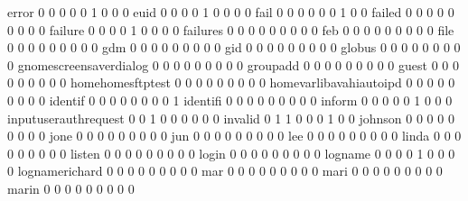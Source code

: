 \documentclass[compress,8pt]{beamer}
\begin{document}
\begin{frame}
\begin{Schunk}
  error                                      0   0   0   0   0   1   0   0   0
  euid                                       0   0   0   0   1   0   0   0   0
  fail                                       0   0   0   0   0   0   1   0   0
  failed                                     0   0   0   0   0   0   0   0   0
  failure                                    0   0   0   0   1   0   0   0   0
  failures                                   0   0   0   0   0   0   0   0   0
  feb                                        0   0   0   0   0   0   0   0   0
  file                                       0   0   0   0   0   0   0   0   0
  gdm                                        0   0   0   0   0   0   0   0   0
  gid                                        0   0   0   0   0   0   0   0   0
  globus                                     0   0   0   0   0   0   0   0   0
  gnomescreensaverdialog                     0   0   0   0   0   0   0   0   0
  groupadd                                   0   0   0   0   0   0   0   0   0
  guest                                      0   0   0   0   0   0   0   0   0
  homehomesftptest                           0   0   0   0   0   0   0   0   0
  homevarlibavahiautoipd                     0   0   0   0   0   0   0   0   0
  identif                                    0   0   0   0   0   0   0   0   1
  identifi                                   0   0   0   0   0   0   0   0   0
  inform                                     0   0   0   0   0   1   0   0   0
  inputuserauthrequest                       0   0   1   0   0   0   0   0   0
  invalid                                    0   1   1   0   0   0   1   0   0
  johnson                                    0   0   0   0   0   0   0   0   0
  jone                                       0   0   0   0   0   0   0   0   0
  jun                                        0   0   0   0   0   0   0   0   0
  lee                                        0   0   0   0   0   0   0   0   0
  linda                                      0   0   0   0   0   0   0   0   0
  listen                                     0   0   0   0   0   0   0   0   0
  login                                      0   0   0   0   0   0   0   0   0
  logname                                    0   0   0   0   1   0   0   0   0
  lognamerichard                             0   0   0   0   0   0   0   0   0
  mar                                        0   0   0   0   0   0   0   0   0
  mari                                       0   0   0   0   0   0   0   0   0
  marin                                      0   0   0   0   0   0   0   0   0

\end{Schunk}
\end{frame}
\end{document}

